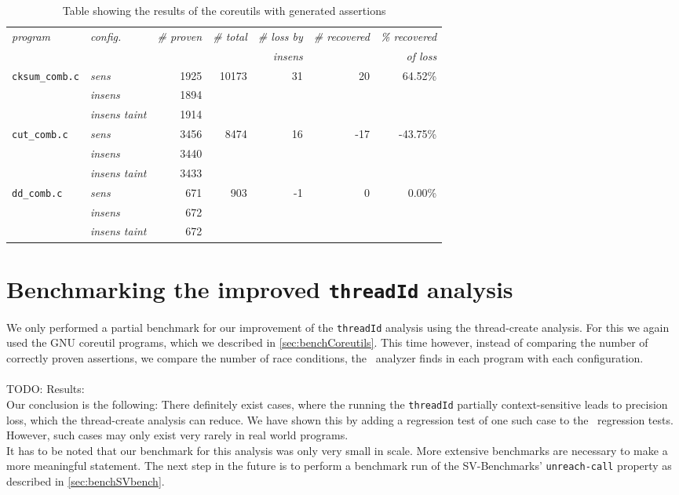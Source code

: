       \begin{table}
        \centering
        \begin{tabular}{l|l||r|r||r|r|r}
          \textit{program} & \textit{config.} & \textit{\# proven} & \textit{\# total} & \textit{\# loss by} & \textit{\# recovered} & \textit{\% recovered}\\
            &  &  &  & \textit{insens} & & \textit{of loss}\\
          \hline
          \texttt{cksum\_comb.c} & \textit{sens} & 1925 & 10173 & 31 & 20 & 64.52\%\\
          & \textit{insens} & 1894 & & & & \\
          & \textit{insens taint} & 1914 & & & & \\
          \hline
          \texttt{cut\_comb.c} & \textit{sens} & 3456 & 8474 & 16 & -17 & -43.75\%\\
          & \textit{insens} & 3440 & & & & \\
          & \textit{insens taint} & 3433 & & & & \\
          \hline
          \texttt{dd\_comb.c} & \textit{sens} & 671 & 903 & -1 & 0 & 0.00\%\\
          & \textit{insens} & 672 & & & & \\
          & \textit{insens taint} & 672 & & & & \\
          \hline
        \end{tabular}
        \caption{Table showing the results of the coreutils with generated assertions}
        \label{tbl:resultCoreutils}
      \end{table}
    
  \section{Benchmarking the improved \texttt{threadId} analysis}
    We only performed a partial benchmark for our improvement of the \texttt{threadId} analysis using the thread-create analysis. For this we again used the GNU coreutil programs, which we described in \autoref{sec:benchCoreutils}. This time however, instead of comparing the number of correctly proven assertions, we compare the number of race conditions, the \gob\ analyzer finds in each program with each configuration.\\
    \\
    TODO: Results:
    \\
    Our conclusion is the following: There definitely exist cases, where the running the \texttt{threadId} partially context-sensitive leads to precision loss, which the thread-create analysis can reduce. We have shown this by adding a regression test of one such case to the \gob\ regression tests. However, such cases may only exist very rarely in real world programs.\\
    It has to be noted that our benchmark for this analysis was only very small in scale. More extensive benchmarks are necessary to make a more meaningful statement. The next step in the future is to perform a benchmark run of the SV-Benchmarks' \texttt{unreach-call} property as described in \autoref{sec:benchSVbench}.
